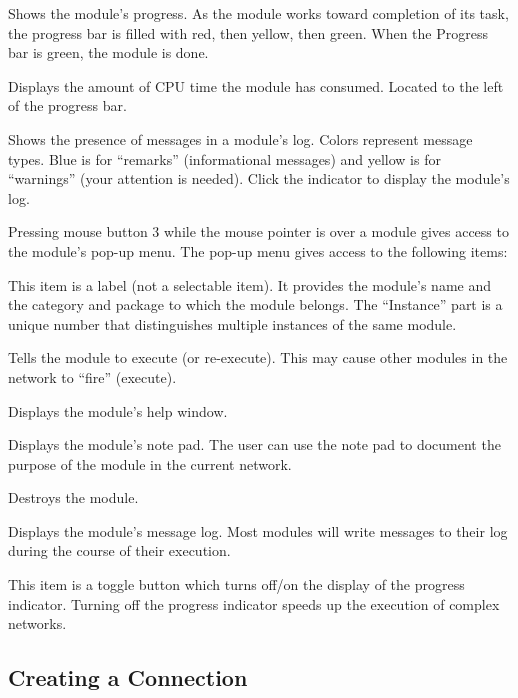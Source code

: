 \begin{description}
   Shows the module's progress.  As the module
  works toward completion of its task, the progress bar is filled
  with red, then yellow, then green.  When the Progress bar
  is green, the module is done.
  
   Displays the amount of CPU time the module has
  consumed.  Located to the left of the progress bar.
  
   Shows the presence of messages in a
  module's log.  Colors represent message types.  Blue is for
  ``remarks'' (informational messages) and yellow is for ``warnings''
  (your attention is needed).  Click the indicator to display the
  module's log.

 Pressing mouse button 3 while the mouse
  pointer is over a module gives access to the module's pop-up menu.  The
  pop-up menu gives access to the following items:
  \begin{description}
     This item is a
    label (not a selectable item).  It provides the module's name and
    the category and package to which the module belongs.  The
    ``Instance'' part is a unique number that distinguishes multiple
    instances of the same module.

     Tells the module to
    execute (or re-execute).  This may cause other modules in the
    network to ``fire'' (execute).

     Displays the module's help window.
    
     Displays the module's note pad.
    The user can use the note pad to document the purpose of the module in
    the current network.

     Destroys the module.
    
     Displays the module's message log.  Most
    modules will write messages to their log during the course of
    their execution.
    
     This item is a toggle button which
    turns off/on the display of the progress indicator.  Turning off
    the progress indicator speeds up the execution of complex
    networks.
  \end{description}
\end{description}


\subsection{Creating a Connection}
\label{sec:connectmods}

